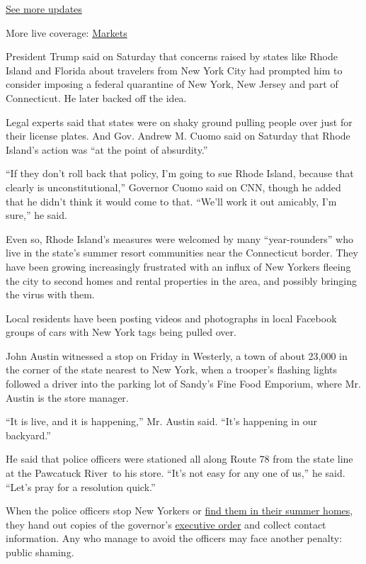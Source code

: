 \href{https://www.nytimes3xbfgragh.onion/2020/09/11/world/covid-19-coronavirus.html?action=click\&pgtype=Article\&state=default\&region=MAIN_CONTENT_1\&context=storylines_live_updates}{See
more updates}

More live coverage:
\href{https://www.nytimes3xbfgragh.onion/live/2020/09/11/business/stock-market-today-coronavirus?action=click\&pgtype=Article\&state=default\&region=MAIN_CONTENT_1\&context=storylines_live_updates}{Markets}

President Trump said on Saturday that concerns raised by states like
Rhode Island and Florida about travelers from New York City had prompted
him to consider imposing a federal quarantine of New York, New Jersey
and part of Connecticut. He later backed off the idea.

Legal experts said that states were on shaky ground pulling people over
just for their license plates. And Gov. Andrew M. Cuomo said on Saturday
that Rhode Island's action was ``at the point of absurdity.''

``If they don't roll back that policy, I'm going to sue Rhode Island,
because that clearly is unconstitutional,'' Governor Cuomo said on CNN,
though he added that he didn't think it would come to that. ``We'll work
it out amicably, I'm sure,'' he said.

Even so, Rhode Island's measures were welcomed by many ``year-rounders''
who live in the state's summer resort communities near the Connecticut
border. They have been growing increasingly frustrated with an influx of
New Yorkers fleeing the city to second homes and rental properties in
the area, and possibly bringing the virus with them.

Local residents have been posting videos and photographs in local
Facebook groups of cars with New York tags being pulled over.

John Austin witnessed a stop on Friday in Westerly, a town of about
23,000 in the corner of the state nearest to New York, when a trooper's
flashing lights followed a driver into the parking lot of Sandy's Fine
Food Emporium, where Mr. Austin is the store manager.

``It is live, and it is happening,'' Mr. Austin said. ``It's happening
in our backyard.''

He said that police officers were stationed all along Route 78 from the
state line at the Pawcatuck River~to his store. ``It's not easy for any
one of us,'' he said. ``Let's pray for a resolution quick.''

When the police officers stop New Yorkers or
\href{https://www.providencejournal.com/news/20200327/not-rsquoall-that-neighborlyrsquo-police-national-guard-out-in-westerly-looking-for-new-yorkers}{find
them in their summer homes}, they hand out copies of the governor's
\href{http://www.governor.ri.gov/documents/orders/Executive-Order-20-12.pdf}{executive
order} and collect contact information. Any who manage to avoid the
officers may face another penalty: public shaming.

